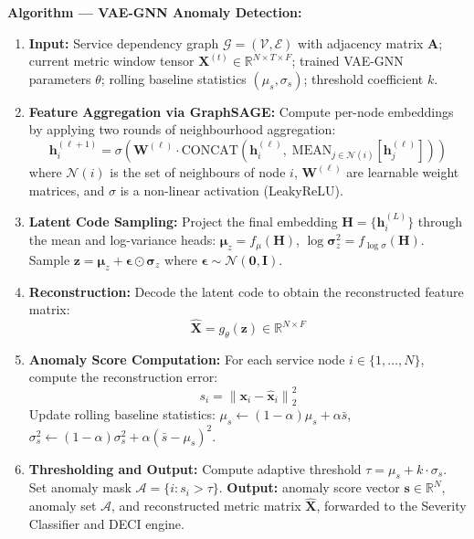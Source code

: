 \noindent\textbf{Algorithm — VAE-GNN Anomaly Detection:}

\begin{enumerate}
    \item \textbf{Input:} Service dependency graph $\mathcal{G} = (\mathcal{V}, \mathcal{E})$ with adjacency matrix $\mathbf{A}$; current metric window tensor $\mathbf{X}^{(t)} \in \mathbb{R}^{N \times T \times F}$; trained VAE-GNN parameters $\theta$; rolling baseline statistics $(\mu_s, \sigma_s)$; threshold coefficient $k$.

    \item \textbf{Feature Aggregation via GraphSAGE:} Compute per-node embeddings by applying two rounds of neighbourhood aggregation:
    \[
        \mathbf{h}_i^{(\ell+1)} = \sigma\!\left(\mathbf{W}^{(\ell)} \cdot \text{CONCAT}\!\left(\mathbf{h}_i^{(\ell)},\; \text{MEAN}_{j \in \mathcal{N}(i)}\!\left[\mathbf{h}_j^{(\ell)}\right]\right)\right)
    \]
    where $\mathcal{N}(i)$ is the set of neighbours of node $i$, $\mathbf{W}^{(\ell)}$ are learnable weight matrices, and $\sigma$ is a non-linear activation (LeakyReLU).

    \item \textbf{Latent Code Sampling:} Project the final embedding $\mathbf{H} = \{\mathbf{h}_i^{(L)}\}$ through the mean and log-variance heads: $\boldsymbol{\mu}_z = f_\mu(\mathbf{H})$, $\log \boldsymbol{\sigma}_z^2 = f_{\log\sigma}(\mathbf{H})$. Sample $\mathbf{z} = \boldsymbol{\mu}_z + \boldsymbol{\epsilon} \odot \boldsymbol{\sigma}_z$ where $\boldsymbol{\epsilon} \sim \mathcal{N}(\mathbf{0}, \mathbf{I})$.

    \item \textbf{Reconstruction:} Decode the latent code to obtain the reconstructed feature matrix:
    \[
        \hat{\mathbf{X}} = g_\theta(\mathbf{z}) \in \mathbb{R}^{N \times F}
    \]

    \item \textbf{Anomaly Score Computation:} For each service node $i \in \{1, \ldots, N\}$, compute the reconstruction error:
    \[
        s_i = \left\|\mathbf{x}_i - \hat{\mathbf{x}}_i\right\|_2^2
    \]
    Update rolling baseline statistics: $\mu_s \leftarrow (1-\alpha)\mu_s + \alpha \bar{s}$,\; $\sigma_s^2 \leftarrow (1-\alpha)\sigma_s^2 + \alpha(\bar{s} - \mu_s)^2$.

    \item \textbf{Thresholding and Output:} Compute adaptive threshold $\tau = \mu_s + k \cdot \sigma_s$. Set anomaly mask $\mathcal{A} = \{i : s_i > \tau\}$. \textbf{Output:} anomaly score vector $\mathbf{s} \in \mathbb{R}^N$, anomaly set $\mathcal{A}$, and reconstructed metric matrix $\hat{\mathbf{X}}$, forwarded to the Severity Classifier and DECI engine.
\end{enumerate}


